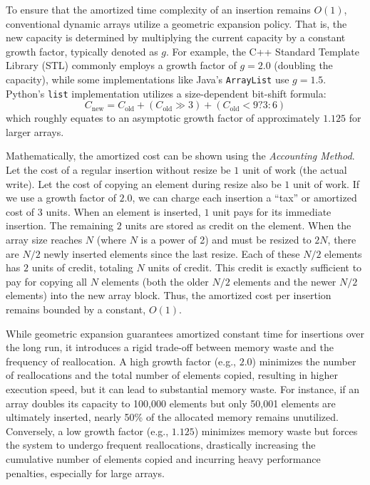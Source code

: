 To ensure that the amortized time complexity of an insertion remains $O(1)$, 
conventional dynamic arrays utilize a geometric expansion policy. That is, the 
new capacity is determined by multiplying the current capacity by a constant 
growth factor, typically denoted as $g$. For example, the C++ Standard Template 
Library (STL) commonly employs a growth factor of $g = 2.0$ (doubling the 
capacity), while some implementations like Java's \texttt{ArrayList} use $g = 1.5$. 
Python's \texttt{list} implementation utilizes a size-dependent bit-shift 
formula:
\begin{equation}
    C_{\text{new}} = C_{\text{old}} + (C_{\text{old}} \gg 3) + (C_{\text{old}} < 9 ? 3 : 6)
\end{equation}
which roughly equates to an asymptotic growth factor of approximately $1.125$ 
for larger arrays.

Mathematically, the amortized cost can be shown using the \textit{Accounting Method}. 
Let the cost of a regular insertion without resize be $1$ unit of work (the 
actual write). Let the cost of copying an element during resize also be $1$ unit 
of work. If we use a growth factor of $2.0$, we can charge each insertion a 
``tax'' or amortized cost of $3$ units. When an element is inserted, $1$ unit pays 
for its immediate insertion. The remaining $2$ units are stored as credit on the 
element. When the array size reaches $N$ (where $N$ is a power of 2) and must be 
resized to $2N$, there are $N/2$ newly inserted elements since the last resize. 
Each of these $N/2$ elements has $2$ units of credit, totaling $N$ units of credit. 
This credit is exactly sufficient to pay for copying all $N$ elements (both the 
older $N/2$ elements and the newer $N/2$ elements) into the new array block. 
Thus, the amortized cost per insertion remains bounded by a constant, $O(1)$.

While geometric expansion guarantees amortized constant time for insertions over 
the long run, it introduces a rigid trade-off between memory waste and the 
frequency of reallocation. A high growth factor (e.g., $2.0$) minimizes the 
number of reallocations and the total number of elements copied, resulting in 
higher execution speed, but it can lead to substantial memory waste. For instance, 
if an array doubles its capacity to 100,000 elements but only 50,001 elements 
are ultimately inserted, nearly 50\% of the allocated memory remains unutilized. 
Conversely, a low growth factor (e.g., $1.125$) minimizes memory waste but forces 
the system to undergo frequent reallocations, drastically increasing the 
cumulative number of elements copied and incurring heavy performance penalties, 
especially for large arrays. 

